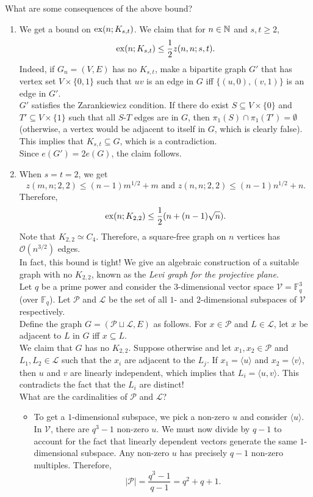 \documentclass{article}
\begin{document}
		What are some consequences of the above bound?
		\begin{enumerate}
			\item We get a bound on $\operatorname{ex}(n;K_{s,t})$. We claim that for $n\in\mathbb{N}$ and $s,t\ge 2$,
			\[ \operatorname{ex}(n;K_{s,t}) \le \frac{1}{2} z(n,n;s,t). \]
			Indeed, if $G_n = (V,E)$ has no $K_{s,t}$, make a bipartite graph $G'$ that has vertex set $V \times \{0,1\}$ such that $uv$ is an edge in $G$ iff $\{(u,0),(v,1)\}$ is an edge in $G'$.\\
			$G'$ satisfies the Zarankiewicz condition. If there do exist $S \subseteq V\times\{0\}$ and $T' \subseteq V \times \{1\}$ such that all $S$-$T$ edges are in $G$, then $\pi_1(S) \cap \pi_1(T') = \emptyset$ (otherwise, a vertex would be adjacent to itself in $G$, which is clearly false). This implies that $K_{s,t} \subseteq G$, which is a contradiction.\\
			Since $e(G') = 2e(G)$, the claim follows.

			\item When $s=t=2$, we get
			\[ z(m,n;2,2) \le (n-1)m^{1/2} + m \text{ and } z(n,n;2,2) \le (n-1)n^{1/2} + n. \]
			Therefore,
			\[ \operatorname{ex}(n;K_{2,2}) \le \frac{1}{2} (n + (n-1)\sqrt{n}). \]
			Note that $K_{2,2}\simeq C_4$. Therefore, a square-free graph on $n$ vertices has $\mathcal{O}(n^{3/2})$ edges.\\

			In fact, this bound is tight! We give an algebraic construction of a suitable graph with no $K_{2,2}$, known as the \emph{Levi graph for the projective plane}.\\
			Let $q$ be a prime power and consider the $3$-dimensional vector space $\mathcal{V} = \mathbb{F}_q^3$ (over $\mathbb{F}_q$). Let $\mathcal{P}$ and $\mathcal{L}$ be the set of all $1$- and $2$-dimensional subspaces of $\mathcal{V}$ respectively.\\
			Define the graph $G = ( \mathcal{P} \sqcup \mathcal{L} , E )$ as follows. For $x \in \mathcal{P}$ and $L \in \mathcal{L}$, let $x$ be adjacent to $L$ in $G$ iff $x \subseteq L$.\\
			We claim that $G$ has no $K_{2,2}$. Suppose otherwise and let $x_1,x_2\in\mathcal{P}$ and $L_1,L_2\in\mathcal{L}$ such that the $x_i$ are adjacent to the $L_j$. If $x_1 = \langle u \rangle$ and $x_2 = \langle v \rangle$, then $u$ and $v$ are linearly independent, which implies that $L_i = \langle u,v\rangle$. This contradicts the fact that the $L_i$ are distinct!\\
			What are the cardinalities of $\mathcal{P}$ and $\mathcal{L}$?
			\begin{itemize}
				\item To get a $1$-dimensional subspace, we pick a non-zero $u$ and consider $\langle u\rangle$. In $\mathcal{V}$, there are $q^3 - 1$ non-zero $u$. We must now divide by $q-1$ to account for the fact that linearly dependent vectors generate the same $1$-dimensional subspace. Any non-zero $u$ has precisely $q-1$ non-zero multiples. Therefore,
				\[ |\mathcal{P}| = \frac{q^3 - 1}{q - 1} = q^2 + q + 1. \]


\end{itemize}
\end{enumerate}
\end{document}
